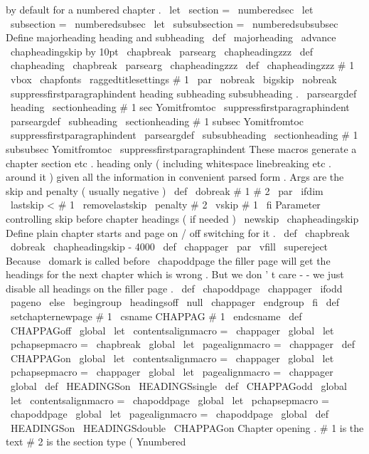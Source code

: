 {{{{by
default
for
a
numbered
chapter
.
\
let
\
section
=
\
numberedsec
\
let
\
subsection
=
\
numberedsubsec
\
let
\
subsubsection
=
\
numberedsubsubsec
%
Define
majorheading
heading
and
subheading
\
def
\
majorheading
{
%
{
\
advance
\
chapheadingskip
by
10pt
\
chapbreak
}
%
\
parsearg
\
chapheadingzzz
}
\
def
\
chapheading
{
\
chapbreak
\
parsearg
\
chapheadingzzz
}
\
def
\
chapheadingzzz
#
1
{
%
\
vbox
{
\
chapfonts
\
raggedtitlesettings
#
1
\
par
}
%
\
nobreak
\
bigskip
\
nobreak
\
suppressfirstparagraphindent
}
%
heading
subheading
subsubheading
.
\
parseargdef
\
heading
{
\
sectionheading
{
#
1
}
{
sec
}
{
Yomitfromtoc
}
{
}
\
suppressfirstparagraphindent
}
\
parseargdef
\
subheading
{
\
sectionheading
{
#
1
}
{
subsec
}
{
Yomitfromtoc
}
{
}
\
suppressfirstparagraphindent
}
\
parseargdef
\
subsubheading
{
\
sectionheading
{
#
1
}
{
subsubsec
}
{
Yomitfromtoc
}
{
}
\
suppressfirstparagraphindent
}
%
These
macros
generate
a
chapter
section
etc
.
heading
only
%
(
including
whitespace
linebreaking
etc
.
around
it
)
%
given
all
the
information
in
convenient
parsed
form
.
%
Args
are
the
skip
and
penalty
(
usually
negative
)
\
def
\
dobreak
#
1
#
2
{
\
par
\
ifdim
\
lastskip
<
#
1
\
removelastskip
\
penalty
#
2
\
vskip
#
1
\
fi
}
%
Parameter
controlling
skip
before
chapter
headings
(
if
needed
)
\
newskip
\
chapheadingskip
%
Define
plain
chapter
starts
and
page
on
/
off
switching
for
it
.
\
def
\
chapbreak
{
\
dobreak
\
chapheadingskip
{
-
4000
}
}
\
def
\
chappager
{
\
par
\
vfill
\
supereject
}
%
Because
\
domark
is
called
before
\
chapoddpage
the
filler
page
will
%
get
the
headings
for
the
next
chapter
which
is
wrong
.
But
we
don
'
t
%
care
-
-
we
just
disable
all
headings
on
the
filler
page
.
\
def
\
chapoddpage
{
%
\
chappager
\
ifodd
\
pageno
\
else
\
begingroup
\
headingsoff
\
null
\
chappager
\
endgroup
\
fi
}
\
def
\
setchapternewpage
#
1
{
\
csname
CHAPPAG
#
1
\
endcsname
}
\
def
\
CHAPPAGoff
{
%
\
global
\
let
\
contentsalignmacro
=
\
chappager
\
global
\
let
\
pchapsepmacro
=
\
chapbreak
\
global
\
let
\
pagealignmacro
=
\
chappager
}
\
def
\
CHAPPAGon
{
%
\
global
\
let
\
contentsalignmacro
=
\
chappager
\
global
\
let
\
pchapsepmacro
=
\
chappager
\
global
\
let
\
pagealignmacro
=
\
chappager
\
global
\
def
\
HEADINGSon
{
\
HEADINGSsingle
}
}
\
def
\
CHAPPAGodd
{
%
\
global
\
let
\
contentsalignmacro
=
\
chapoddpage
\
global
\
let
\
pchapsepmacro
=
\
chapoddpage
\
global
\
let
\
pagealignmacro
=
\
chapoddpage
\
global
\
def
\
HEADINGSon
{
\
HEADINGSdouble
}
}
\
CHAPPAGon
%
Chapter
opening
.
%
%
#
1
is
the
text
#
2
is
the
section
type
(
Ynumbered
}}}}
